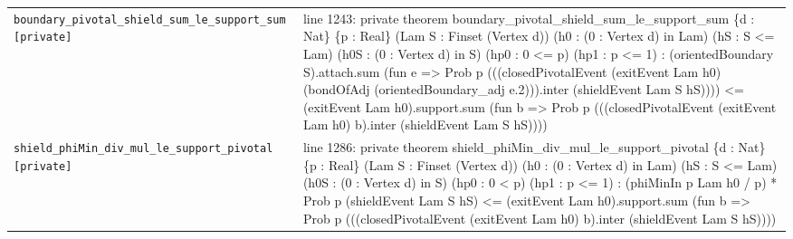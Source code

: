 \documentclass[10pt]{article}
\begin{document}
\begin{longtable}{>{\raggedright\arraybackslash}p{} >{\raggedright\arraybackslash}p{}}
\texttt{boundary\_\allowbreak{}pivotal\_\allowbreak{}shield\_\allowbreak{}sum\_\allowbreak{}le\_\allowbreak{}support\_\allowbreak{}sum [private]} & {\ttfamily\scriptsize line 1243:\allowbreak{} private theorem boundary\_\allowbreak{}pivotal\_\allowbreak{}shield\_\allowbreak{}sum\_\allowbreak{}le\_\allowbreak{}support\_\allowbreak{}sum \{d :\allowbreak{} Nat\} \{p :\allowbreak{} Real\} (\allowbreak{}Lam S :\allowbreak{} Finset (\allowbreak{}Vertex d)\allowbreak{})\allowbreak{} (\allowbreak{}h0 :\allowbreak{} (\allowbreak{}0 :\allowbreak{} Vertex d)\allowbreak{} in Lam)\allowbreak{} (\allowbreak{}hS :\allowbreak{} S <=\allowbreak{} Lam)\allowbreak{} (\allowbreak{}h0S :\allowbreak{} (\allowbreak{}0 :\allowbreak{} Vertex d)\allowbreak{} in S)\allowbreak{} (\allowbreak{}hp0 :\allowbreak{} 0 <=\allowbreak{} p)\allowbreak{} (\allowbreak{}hp1 :\allowbreak{} p <=\allowbreak{} 1)\allowbreak{} :\allowbreak{} (\allowbreak{}orientedBoundary S)\allowbreak{}.\allowbreak{}attach.\allowbreak{}sum (\allowbreak{}fun e =\allowbreak{}> Prob p (\allowbreak{}(\allowbreak{}(\allowbreak{}closedPivotalEvent (\allowbreak{}exitEvent Lam h0)\allowbreak{} (\allowbreak{}bondOfAdj (\allowbreak{}orientedBoundary\_\allowbreak{}adj e.\allowbreak{}2)\allowbreak{})\allowbreak{})\allowbreak{}.\allowbreak{}inter (\allowbreak{}shieldEvent Lam S hS)\allowbreak{})\allowbreak{})\allowbreak{})\allowbreak{} <=\allowbreak{} (\allowbreak{}exitEvent Lam h0)\allowbreak{}.\allowbreak{}support.\allowbreak{}sum (\allowbreak{}fun b =\allowbreak{}> Prob p (\allowbreak{}(\allowbreak{}(\allowbreak{}closedPivotalEvent (\allowbreak{}exitEvent Lam h0)\allowbreak{} b)\allowbreak{}.\allowbreak{}inter (\allowbreak{}shieldEvent Lam S hS)\allowbreak{})\allowbreak{})\allowbreak{})\allowbreak{}} \\[0.45em]
\texttt{shield\_\allowbreak{}phiMin\_\allowbreak{}div\_\allowbreak{}mul\_\allowbreak{}le\_\allowbreak{}support\_\allowbreak{}pivotal [private]} & {\ttfamily\scriptsize line 1286:\allowbreak{} private theorem shield\_\allowbreak{}phiMin\_\allowbreak{}div\_\allowbreak{}mul\_\allowbreak{}le\_\allowbreak{}support\_\allowbreak{}pivotal \{d :\allowbreak{} Nat\} \{p :\allowbreak{} Real\} (\allowbreak{}Lam S :\allowbreak{} Finset (\allowbreak{}Vertex d)\allowbreak{})\allowbreak{} (\allowbreak{}h0 :\allowbreak{} (\allowbreak{}0 :\allowbreak{} Vertex d)\allowbreak{} in Lam)\allowbreak{} (\allowbreak{}hS :\allowbreak{} S <=\allowbreak{} Lam)\allowbreak{} (\allowbreak{}h0S :\allowbreak{} (\allowbreak{}0 :\allowbreak{} Vertex d)\allowbreak{} in S)\allowbreak{} (\allowbreak{}hp0 :\allowbreak{} 0 < p)\allowbreak{} (\allowbreak{}hp1 :\allowbreak{} p <=\allowbreak{} 1)\allowbreak{} :\allowbreak{} (\allowbreak{}phiMinIn p Lam h0 /\allowbreak{} p)\allowbreak{} *\allowbreak{} Prob p (\allowbreak{}shieldEvent Lam S hS)\allowbreak{} <=\allowbreak{} (\allowbreak{}exitEvent Lam h0)\allowbreak{}.\allowbreak{}support.\allowbreak{}sum (\allowbreak{}fun b =\allowbreak{}> Prob p (\allowbreak{}(\allowbreak{}(\allowbreak{}closedPivotalEvent (\allowbreak{}exitEvent Lam h0)\allowbreak{} b)\allowbreak{}.\allowbreak{}inter (\allowbreak{}shieldEvent Lam S hS)\allowbreak{})\allowbreak{})\allowbreak{})\allowbreak{}} \\[0.45em]

\end{longtable}
\end{document}
